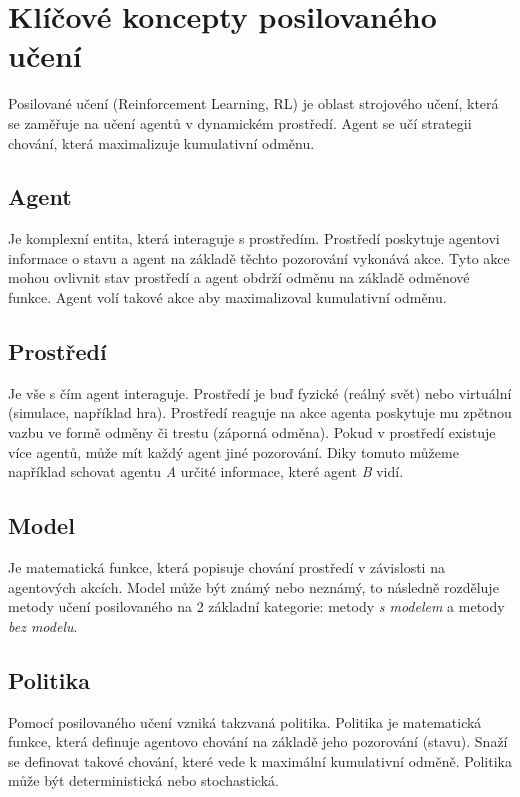 \section{Klíčové koncepty posilovaného učení}
Posilované učení (Reinforcement Learning, RL) je oblast strojového učení, která se zaměřuje na učení agentů v dynamickém prostředí.
Agent se učí strategii chování, která maximalizuje kumulativní odměnu.

\subsection{Agent}

Je komplexní entita, která interaguje s prostředím.
Prostředí poskytuje agentovi informace o stavu a agent na základě těchto pozorování vykonává akce.
Tyto akce mohou ovlivnit stav prostředí a agent obdrží odměnu na základě odměnové funkce.
Agent volí takové akce aby maximalizoval kumulativní odměnu.

\subsection{Prostředí}

Je vše s čím agent interaguje.
Prostředí je buď fyzické (reálný svět) nebo virtuální (simulace, například hra).
Prostředí reaguje na akce agenta poskytuje mu zpětnou vazbu ve formě odměny či trestu (záporná odměna).
Pokud v prostředí existuje více agentů, může mít každý agent jiné pozorování.
Diky tomuto můžeme například schovat agentu \textit{A} určité informace, které agent \textit{B} vidí.

\subsection{Model}

Je matematická funkce, která popisuje chování prostředí v závislosti na agentových akcích.
Model může být známý nebo neznámý, to následně rozděluje metody učení posilovaného na 2 základní kategorie: metody \emph{s modelem} a metody \emph{ bez modelu}.


\subsection{Politika}

Pomocí posilovaného učení vzniká takzvaná politika.
Politika je matematická funkce, která definuje agentovo chování na základě jeho pozorování (stavu).
Snaží se definovat takové chování, které vede k maximální kumulativní odměně.
Politika může být deterministická nebo stochastická.


